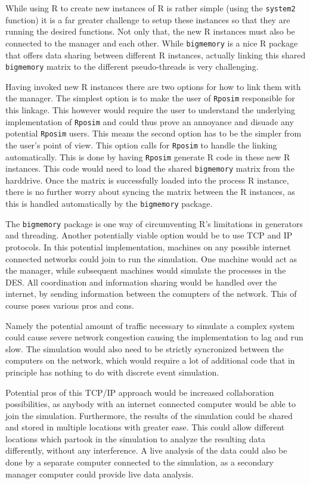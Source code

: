 \documentclass[a4paper, 11pt]{article} %
\begin{document}
While using R to create new instances of R is rather simple (using the \texttt{system2} function) it is a far greater challenge to setup these instances so that they are running the desired functions. Not only that, the new R instances must also be connected to the manager and each other. While \texttt{bigmemory} is a nice R package that offers data sharing between different R instances, actually linking this shared \texttt{bigmemory} matrix to the different pseudo-threads is very challenging. 

Having invoked new R instances there are two options for how to link them with the manager. The simplest option is to make the user of \texttt{Rposim} responsible for this linkage. This however would require the user to understand the underlying implementation of \texttt{Rposim} and could thus prove an annoyance and disuade any potential \texttt{Rposim} users. This means the second option has to be the simpler from the user's point of view. This option calls for \texttt{Rposim} to handle the linking automatically. This is done by having \texttt{Rposim} generate R code in these new R instances. This code would need to load the shared \texttt{bigmemory} matrix from the harddrive. Once the matrix is successfully loaded into the process R instance, there is no further worry about syncing the matrix between the R instances, as this is handled automatically by the \texttt{bigmemory} package.

The \texttt{bigmemory} package is one way of circumventing R's limitations in generators and threading. Another potentially viable option would be to use TCP and IP protocols. In this potential implementation, machines on any possible internet connected networks could join to run the simulation. One machine would act as the manager, while subsequent machines would simulate the processes in the DES. All coordination and information sharing would be handled over the internet, by sending information between the comupters of the network. This of course poses various pros and cons.

Namely the potential amount of traffic necessary to simulate a complex system could cause severe network congestion causing the implementation to lag and run slow. The simulation would also need to be strictly syncronized between the computers on the network, which would require a lot of additional code that in principle has nothing to do with discrete event simulation.

Potential pros of this TCP/IP approach would be increased collaboration possibilities, as anybody with an internet connected computer would be able to join the simulation. Furthermore, the results of the simulation could be shared and stored in multiple locations with greater ease. This could allow different locations which partook in the simulation to analyze the resulting data differently, without any interference. A live analysis of the data could also be done by a separate computer connected to the simulation, as a secondary manager computer could provide live data analysis.
\end{document}
